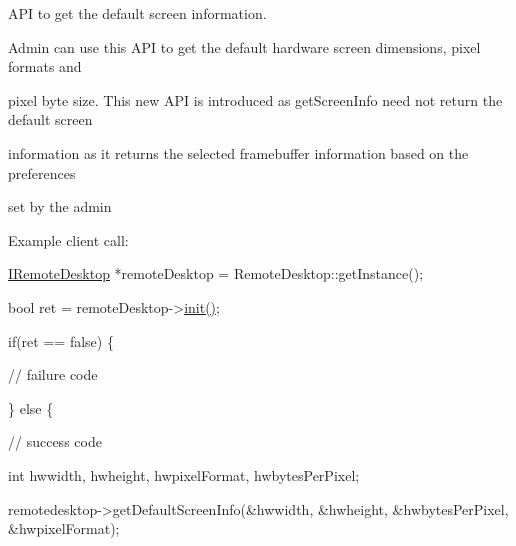 \-A\-P\-I to get the default screen information. 

\-Admin can use this \-A\-P\-I to get the default hardware screen dimensions, pixel formats and

pixel byte size. \-This new \-A\-P\-I is introduced as get\-Screen\-Info need not return the default screen

information as it returns the selected framebuffer information based on the preferences

set by the admin

\-Example client call\-:


\begin{DoxyPre}\end{DoxyPre}



\begin{DoxyPre}  \hyperlink{classknoxremotedesktop_1_1IRemoteDesktop}{IRemoteDesktop} *remoteDesktop = RemoteDesktop::getInstance();\end{DoxyPre}



\begin{DoxyPre}  bool ret = remoteDesktop->\hyperlink{classknoxremotedesktop_1_1IRemoteDesktop_a7bed40d98c61713a69cf1dad8b37beae}{init()};\end{DoxyPre}



\begin{DoxyPre}  if(ret == false)  \{\end{DoxyPre}



\begin{DoxyPre}     // failure code\end{DoxyPre}



\begin{DoxyPre}  \} else \{\end{DoxyPre}



\begin{DoxyPre}     // success code\end{DoxyPre}



\begin{DoxyPre}     int	hwwidth, hwheight, hwpixelFormat, hwbytesPerPixel;\end{DoxyPre}



\begin{DoxyPre}     remotedesktop->getDefaultScreenInfo(&hwwidth, &hwheight, &hwbytesPerPixel, &hwpixelFormat);\end{DoxyPre}



